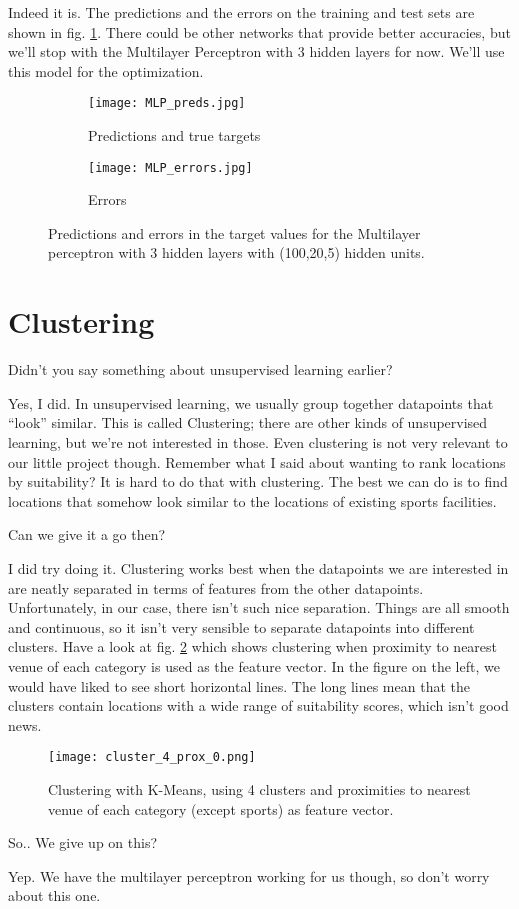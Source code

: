 Indeed it is. The predictions and the errors on the training and test sets are shown in fig. \ref{fig:MLP-preds-errors}. There could be other networks that provide better accuracies, but we'll stop with the Multilayer Perceptron with 3 hidden layers for now. We'll use this model for the optimization. 

\begin{figure}
	\centering
	\begin{subfigure}{\linewidth}
		\texttt{[image: MLP\_preds.jpg]}
		\caption{Predictions and true targets}
	\end{subfigure}
	\begin{subfigure}{\linewidth}
		\texttt{[image: MLP\_errors.jpg]}
		\caption{Errors}
	\end{subfigure}
	\caption{Predictions and errors in the target values for the Multilayer perceptron with 3 hidden layers with (100,20,5) hidden units. \label{fig:MLP-preds-errors}}
\end{figure}


\section{Clustering}

{\color{blue} Didn't you say something about unsupervised learning earlier?}

Yes, I did. In unsupervised learning, we usually group together datapoints that ``look'' similar. This is called Clustering; there are other kinds of unsupervised learning, but we're not interested in those. Even clustering is not very relevant to our little project though. Remember what I said about wanting to rank locations by suitability? It is hard to do that with clustering. The best we can do is to find locations that somehow look similar to the locations of existing sports facilities. 

{\color{blue} Can we give it a go then?}

I did try doing it. Clustering works best when the datapoints we are interested in are neatly separated in terms of features from the other datapoints. Unfortunately, in our case, there isn't such nice separation. Things are all smooth and continuous, so it isn't very sensible to separate datapoints into different clusters. Have a look at fig. \ref{fig:cluster_4_prox_0} which shows clustering when proximity to nearest venue of each category is used as the feature vector. In the figure on the left, we would have liked to see short horizontal lines. The long lines mean that the clusters contain locations with a wide range of suitability scores, which isn't good news. 

\begin{figure}
	\centering
	\texttt{[image: cluster\_4\_prox\_0.png]}
	\caption{Clustering with K-Means, using 4 clusters and proximities to nearest venue of each category (except sports) as feature vector. \label{fig:cluster_4_prox_0}}
\end{figure}



{\color{blue} So.. We give up on this?}

Yep. We have the multilayer perceptron working for us though, so don't worry about this one. 
